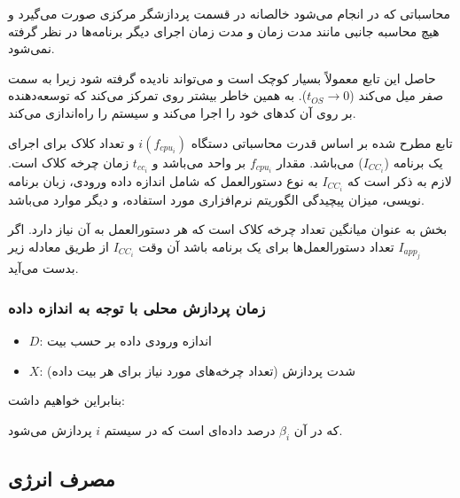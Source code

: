 محاسباتی که در  انجام می‌شود خالصانه در قسمت پردازشگر مرکزی صورت
می‌گیرد و هیچ محاسبه جانبی مانند مدت زمان  و مدت زمان اجرای دیگر
برنامه‌ها در نظر گرفته نمی‌شود.


حاصل این تابع معمولاً بسیار کوچک است و می‌تواند نادیده گرفته شود زیرا به سمت صفر
میل می‌کند ($t_{OS} \rightarrow 0$). به همین خاطر بیشتر روی 
تمرکز می‌کند که توسعه‌دهنده بر روی آن کد‌های خود را اجرا می‌کند و سیستم 
را راه‌اندازی می‌کند.

تابع مطرح شده بر اساس قدرت محاسباتی دستگاه $i(f_{cpu_i})$ و تعداد کلاک 
برای اجرای یک برنامه ($I_{CC_i}$) می‌باشد. مقدار $f_{cpu_i}$ بر واحد 
می‌باشد و $t_{cc_i}$ زمان چرخه کلاک است. لازم به ذکر است که $I_{CC_i}$ به نوع
دستورالعمل که شامل اندازه داده ورودی، زبان برنامه نویسی، میزان پیچیدگی الگوریتم
نرم‌افزاری مورد استفاده، و دیگر موارد می‌باشد.

بخش  به عنوان میانگین تعداد چرخه کلاک است
که هر دستورالعمل به آن نیاز دارد. اگر $I_{app_j}$ تعداد دستورالعمل‌ها برای یک
برنامه باشد آن وقت $I_{CC_i}$ از طریق معادله زیر بدست می‌آید.


\subsubsection{زمان پردازش محلی با توجه به اندازه داده }


\begin{itemize}
    \item $D$: اندازه ورودی داده بر حسب بیت
    \item $X$: شدت پردازش (تعداد چرخه‌های مورد نیاز برای هر بیت داده)
\end{itemize}

بنابراین خواهیم داشت:


که در آن $\beta_{i}$ درصد داده‌‌ای است که در سیستم $i$ پردازش می‌شود.

\subsection{مصرف انرژی}

